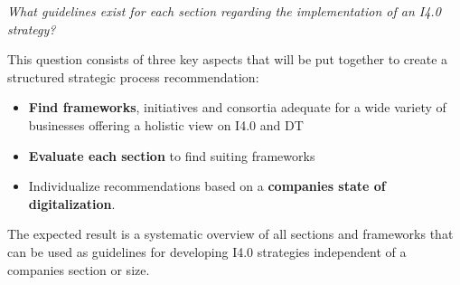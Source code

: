 \emph{What guidelines exist for each section regarding the implementation of an \acf{I4.0} strategy?}


This question consists of three key aspects that will be put together to create a structured strategic process recommendation:
\begin{itemize}
    \item \textbf{Find frameworks}, initiatives and consortia adequate for a wide variety of businesses offering a holistic view on \ac{I4.0} and \ac{DT}
    \item \textbf{Evaluate each section} to find suiting frameworks
    \item Individualize recommendations based on a \textbf{companies state of digitalization}.
\end{itemize}

The expected result is a systematic overview of all sections and frameworks that can be used as guidelines for developing \ac{I4.0} strategies independent of a companies section or size. 



